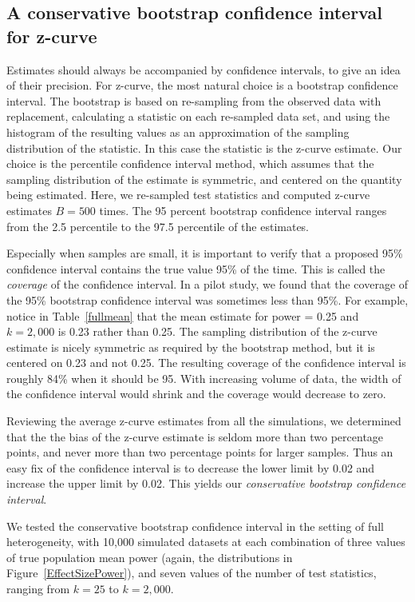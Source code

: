 \documentclass[jou]{apa6} %
\begin{document}
\subsection{A conservative bootstrap confidence interval for z-curve}
Estimates should always be accompanied by confidence intervals, to give an idea of their precision. For z-curve, the most natural choice is a bootstrap confidence interval. The bootstrap
\parencite{Efron1979, EfronTibs1993} is based on re-sampling from the observed data with replacement, calculating a statistic on each re-sampled data set, and using the histogram of the resulting values as an approximation of the sampling distribution of the statistic. In this case the statistic is the z-curve estimate. Our choice is the percentile confidence interval method, which assumes that the sampling distribution of the estimate is symmetric, and centered on the quantity being estimated. Here, we re-sampled test statistics and computed z-curve estimates $B=500$ times. The 95 percent bootstrap confidence interval ranges from the 2.5 percentile to the 97.5 percentile of the estimates.  

Especially when samples are small, it is important to verify that a proposed 95\% confidence interval  contains the true value 95\% of the time. This is called the \emph{coverage} of the confidence interval. In a pilot study, we found that the coverage of the 95\% bootstrap confidence interval was sometimes less than 95\%. For example, notice in Table~\ref{fullmean} that the mean estimate for power = 0.25 and $k=2,000$ is 0.23 rather than 0.25. The sampling distribution of the z-curve estimate is nicely symmetric as required by the bootstrap method, but it is centered on 0.23 and not 0.25. The resulting coverage of the confidence interval is roughly 84\% when it should be 95. With increasing volume of data, the width of the confidence interval would shrink and the coverage would decrease to zero.

Reviewing the average z-curve estimates from all the simulations, we determined that the the bias of the z-curve estimate is seldom more than two percentage points, and never more than two percentage points for larger samples. Thus an easy fix of the confidence interval is to decrease the lower limit by 0.02 and increase the upper limit by 0.02. This yields our \emph{conservative bootstrap confidence interval}.

We tested the conservative bootstrap confidence interval in the setting of full heterogeneity, with 10,000 simulated datasets at each combination of three values of true population mean power (again, the distributions in Figure~\ref{EffectSizePower}), and seven values of the number of test statistics, ranging from $k=25$ to $k=2,000$. 
\end{document}
